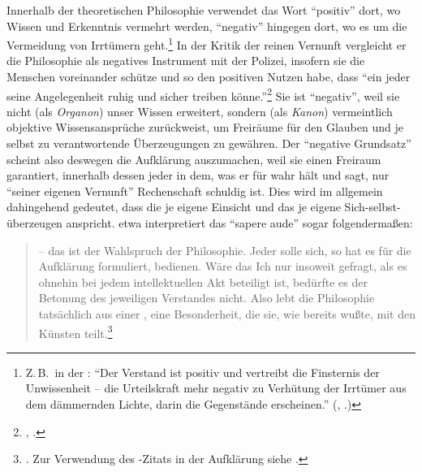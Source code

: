 \label{falscheFaehrte:VernunftkritikalsWissensbegrenzung}
Innerhalb der theoretischen Philosophie verwendet  das Wort
\enquote{positiv} dort, wo Wissen und Erkenntnis vermehrt werden,
\enquote{negativ} hingegen dort, wo es um die Vermeidung von Irrtümern geht.\footnote{Z.\,B.~in der :
\enquote{Der Verstand ist positiv und vertreibt die Finsternis der Unwissenheit
-- die Urteilskraft mehr negativ zu Verhütung der Irrtümer aus dem dämmernden
 Lichte, darin die Gegenstände erscheinen.}
 (\cite[][BA~166]{Kant:AnthropologieinpragmatischerHinsicht1977},
 \cite[][VII: 228.10--12]{Kant:GesammelteWerke1900ff.}.)} In der Kritik der
 reinen Vernunft vergleicht er die Philosophie als negatives Instrument mit der
 Polizei, insofern sie die Menschen voreinander schütze und so den positiven
 Nutzen habe, dass \enquote{ein jeder seine Angelegenheit ruhig und sicher treiben
 könne.}\footnote{\cite[][B~xxv]{Kant:KritikderreinenVernunft2003}, \cite[][III:
16.29--30]{Kant:GesammelteWerke1900ff.}.} Sie ist \enquote{negativ}, weil sie
nicht (als \emph{Organon}) unser Wissen erweitert, sondern (als \emph{Kanon})
vermeintlich objektive Wissensansprüche zurückweist, um Freiräume für den
Glauben und je selbst zu verantwortende Überzeugungen zu gewähren. Der
\enquote{negative Grundsatz} scheint also deswegen die Aufklärung auszumachen,
weil sie einen Freiraum garantiert, innerhalb dessen jeder in dem, was er für
wahr hält und sagt, nur \enquote{seiner eigenen Vernunft} Rechenschaft schuldig
ist. Dies wird im allgemein  dahingehend gedeutet, dass 
die je eigene Einsicht und das je eigene Sich-selbst-überzeugen anspricht.
 etwa interpretiert das
\enquote{sapere aude} sogar folgendermaßen:
\begin{quote}
 -- das ist der Wahlspruch der
Philosophie. Jeder solle sich, so hat  es für die
Aufklärung formuliert,  bedienen. Wäre das Ich
nur insoweit gefragt, als es ohnehin bei jedem intellektuellen Akt beteiligt
ist, bedürfte es der Betonung des jeweiligen  Verstandes nicht.
Also lebt die Philosophie tatsächlich aus einer , eine Besonderheit, die sie, wie  bereits
wußte, mit den Künsten
teilt.\footnote{\cite[][35]{Gerhardt:Selbstbestimmung1999}. Zur Verwendung des
-Zitats in der Aufklärung siehe
\cite{Venturi:ContributiadundizionariostoricoI:WasistAufklaerungSapereaude!1959,Firpo:Ancoraapropositiodienquotesapereaude!1960}.}
\end{quote}
